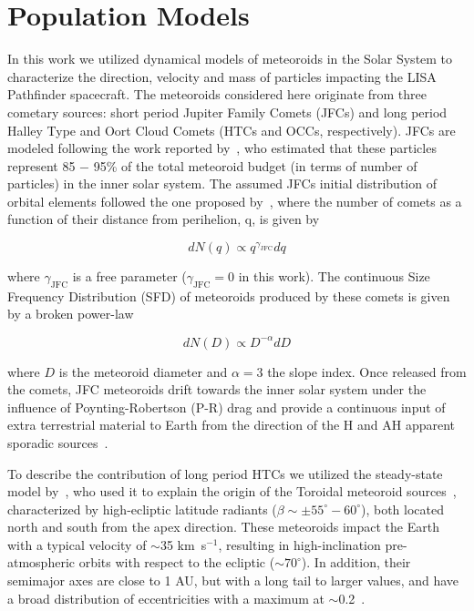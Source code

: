 \documentclass[twocolumn, trackchanges]{aastex61}
\begin{document}
\FloatBarrier
\section{Population Models}\label{sec:models}

In this work we utilized dynamical models of meteoroids in the Solar System to characterize the direction, velocity and mass of particles impacting the LISA Pathfinder spacecraft.
The meteoroids considered here originate from three cometary sources: short period Jupiter Family Comets (JFCs) and long period Halley Type and Oort Cloud Comets (HTCs and OCCs, respectively). JFCs are modeled following the work  reported by~\cite{Nesvorny10,Nesvorny11a}, who estimated that these particles represent 85 $-$ 95\% of the total meteoroid budget (in terms of number of particles) in the inner solar system. The assumed JFCs initial distribution of orbital elements followed the one proposed by~\cite{LevisonDuncan97}, where the number of comets as a function of their distance from perihelion, q, is given by

\begin{equation}
dN(q)\propto q^{\gamma_\mathrm{JFC}} dq\label{nq}
\end{equation}

\noindent where $\gamma_\mathrm{JFC}$ is a free parameter ($\gamma_\mathrm{JFC} = 0$ in this work). The continuous Size Frequency Distribution (SFD) of meteoroids produced by these comets is given by a broken power-law

\begin{equation}
dN(D)\propto D^{-\alpha}dD\label{nd}
\end{equation}

\noindent where $D$ is the meteoroid diameter and $\alpha=3$ the slope index. Once released from the comets, JFC meteoroids drift towards the inner solar system under the influence of Poynting-Robertson (P-R) drag and provide a continuous input of extra terrestrial material to Earth from the direction of the H and AH apparent sporadic sources~\cite[][]{JonesBrown93,Nesvorny10}.

To describe the contribution of long period HTCs we utilized the steady-state model by~\cite{Pokorny14}, who used it to explain the origin of the Toroidal meteoroid sources~\cite[][]{JonesBrown93,CampbellBrown09,Janches15}, characterized by high-ecliptic latitude radiants ($\beta\sim\pm 55^{\circ} - 60^{\circ}$), both located north and south from the apex direction. These meteoroids impact the Earth with a typical velocity of $\sim$35 km~s$^{-1}$, resulting in high-inclination pre-atmospheric orbits with respect to the ecliptic ($\sim70^{\circ}$). In addition, their semimajor axes are close to 1 AU, but with a long tail to larger values, and have a broad distribution of eccentricities with a maximum at $\sim$0.2~\cite[See Figure 13 in][]{Janches15}. 
\end{document}
